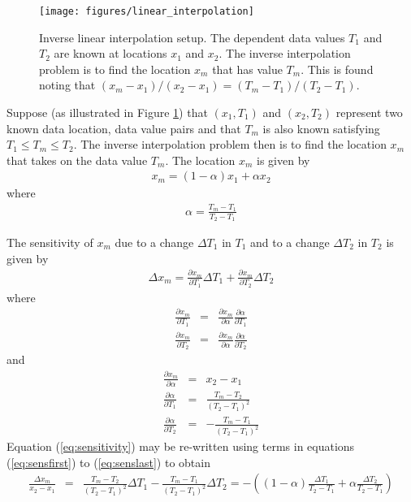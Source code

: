 \documentclass[11pt,twoside]{book}
\newcommand{\pxtone}{ \frac{\partial x_m}{\partial T_1} }
\newcommand{\pxttwo}{ \frac{\partial x_m}{\partial T_2} }
\newcommand{\pxalpha}{ \frac{\partial x_m}{\partial \alpha} }
\newcommand{\palphatone}{ \frac{\partial \alpha}{\partial T_1} }
\newcommand{\palphattwo}{ \frac{\partial \alpha}{\partial T_2} }
\newcommand{\figoptions}{hbp}
\begin{document}
\begin{figure}[\figoptions]
\begin{center}
\texttt{[image: figures/linear\_interpolation]}
\end{center}
 \caption[Inverse linear interpolation setup.]{Inverse linear interpolation setup.
 The dependent data values $T_1$ and $T_2$ are known at locations $x_1$ and $x_2$.
 The inverse interpolation problem is to find the location $x_m$ that has value $T_m$.
 This is found noting that $(x_m-x_1)/(x_2-x_1)=(T_m-T_1)/(T_2-T_1)$.
  }
\label{figisointerp}%
\end{figure}

Suppose (as illustrated in Figure \ref{figisointerp}) that $(x_1,T_1)$ and $(x_2,T_2)$ represent two known data location, data value pairs and that $T_m$ is also known satisfying $T_1\le T_m \le T_2$.  The inverse interpolation problem then is to find the location $x_m$ that takes on the data value $T_m$.  The location $x_m$ is given by
\begin{eqnarray*}
x_m=(1-\alpha)x_1+\alpha x_2
\end{eqnarray*}
where
\begin{eqnarray*}
\alpha=\frac{T_m-T_1}{T_2-T_1}
\end{eqnarray*}

\noindent The sensitivity of $x_m$ due to a change $\Delta T_1$ in $T_1$ and to a change $\Delta T_2$ in $T_2$ is given by
\begin{eqnarray}
\Delta x_m= \pxtone \Delta T_1 + \pxttwo \Delta T_2
\label{eq:sensitivity}
\end{eqnarray}
where
\begin{eqnarray}
\pxtone&=&\pxalpha\palphatone \label{eq:sensfirst}\\
\pxttwo&=&\pxalpha\palphattwo
\end{eqnarray}
and
\begin{eqnarray}
\pxalpha&=&x_2-x_1\\
\palphatone&=&\frac{T_m-T_2}{(T_2-T_1)^2}\\
\palphattwo&=&-\frac{T_m-T_1}{(T_2-T_1)^2}
\label{eq:senslast}
\end{eqnarray}
Equation (\ref{eq:sensitivity}) may be re-written using terms in equations (\ref{eq:sensfirst}) to (\ref{eq:senslast}) to obtain
\begin{eqnarray}
\frac{\Delta x_m}{x_2-x_1}&=&\frac{T_m-T_2}{(T_2-T_1)^2}\Delta T_1-
\frac{T_m-T_1}{(T_2-T_1)^2}\Delta T_2
=-\left(
(1-\alpha)\frac{\Delta T_1}{T_2-T_1}+
\alpha\frac{\Delta T_2}{T_2-T_1}\right)
\label{eq:sensfinal}
\end{eqnarray}
\end{document}
